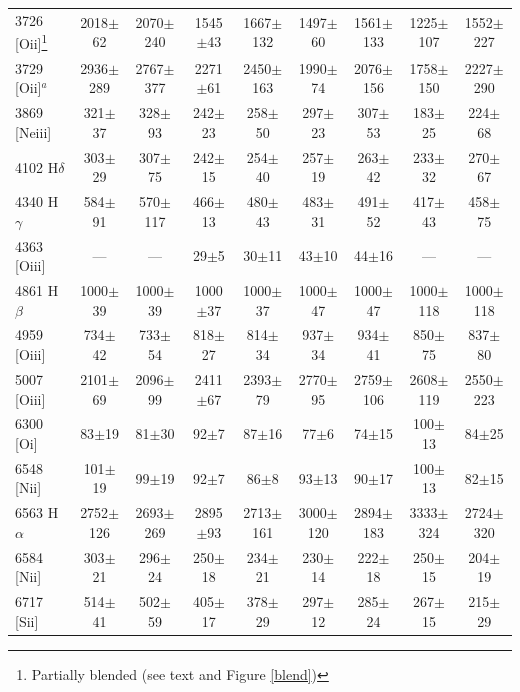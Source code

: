 \documentclass[structabstract]{aa}
\begin{document}
\begin{table}
\begin{minipage}{170mm}
\begin{center}
\begin{tabular}{lcccccccc}
3726  [O{\sc ii}]\footnote{Partially blended (see text and Figure \ref{blend})}        & 2018$\pm$62  &  2070$\pm$240 & 1545$\pm$43 & 1667$\pm$132 &  1497$\pm$60 & 1561$\pm$133 &  1225$\pm$107 &  1552$\pm$227  \\
3729  [O{\sc ii}]$^a$        & 2936$\pm$289 &  2767$\pm$377 & 2271$\pm$61 &  2450$\pm$163 &  1990$\pm$74 & 2076$\pm$156 &  1758$\pm$150 &  2227$\pm$290 \\
3869  [Ne{\sc iii}]        & 321$\pm$37  &  328$\pm$93 & 242$\pm$23 &  258$\pm$50 &  297$\pm$23 & 307$\pm$53 &  183$\pm$25 &  224$\pm$68  \\
4102  H$\delta$              &  303$\pm$29  &  307$\pm$75 &  242$\pm$15  &  254$\pm$40 &   257$\pm$19  & 263$\pm$42 &   233$\pm$32  &  270$\pm$67  \\
4340  H$\gamma$              &  584$\pm$91  &  570$\pm$117 &  466$\pm$13  &  480$\pm$43 &   483$\pm$31  & 491$\pm$52 &   417$\pm$43  &  458$\pm$75  \\
4363  [O{\sc iii}]           & --- & --- & 29$\pm$5 &  30$\pm$11 &  43$\pm$10 & 44$\pm$16 & --- & ---  \\
4861  H$\beta$              &  1000$\pm$39  &  1000$\pm$39 &  1000$\pm$37  &  1000$\pm$37 &   1000$\pm$47  & 1000$\pm$47 &   1000$\pm$118  &  1000$\pm$118  \\
4959  [O{\sc iii}]           & 734$\pm$42 & 733$\pm$54 & 818$\pm$27 &  814$\pm$34 &  937$\pm$34 & 934$\pm$41 &  850$\pm$75 & 837$\pm$80  \\
5007  [O{\sc iii}]           & 2101$\pm$69 & 2096$\pm$99 & 2411$\pm$67 & 2393$\pm$79 & 2770$\pm$95 & 2759$\pm$106 & 2608$\pm$119 & 2550$\pm$223  \\
6300  [O{\sc i}]           &      83$\pm$19    & 81$\pm$30  &  92$\pm$7   & 87$\pm$16 &  77$\pm$6   &  74$\pm$15  &  100$\pm$13  &  84$\pm$25  \\
6548  [N{\sc ii}]           &      101$\pm$19    &  99$\pm$19  &  92$\pm$7    &  86$\pm$8  &   93$\pm$13   & 90$\pm$17  &  100$\pm$13  & 82$\pm$15  \\
6563  H$\alpha$              & 2752$\pm$126 & 2693$\pm$269 & 2895$\pm$93 & 2713$\pm$161 &  3000$\pm$120  & 2894$\pm$183 & 3333$\pm$324 & 2724$\pm$320  \\
6584  [N{\sc ii}]            &  303$\pm$21 &  296$\pm$24 &  250$\pm$18  & 234$\pm$21 &   230$\pm$14  & 222$\pm$18 &  250$\pm$15  & 204$\pm$19  \\
6717  [S{\sc ii}]            &  514$\pm$41  &  502$\pm$59 &  405$\pm$17  & 378$\pm$29 &   297$\pm$12  & 285$\pm$24 &   267$\pm$15  &  215$\pm$29  \\

\end{tabular}
\end{center}
\end{minipage}
\end{table}
\end{document}
